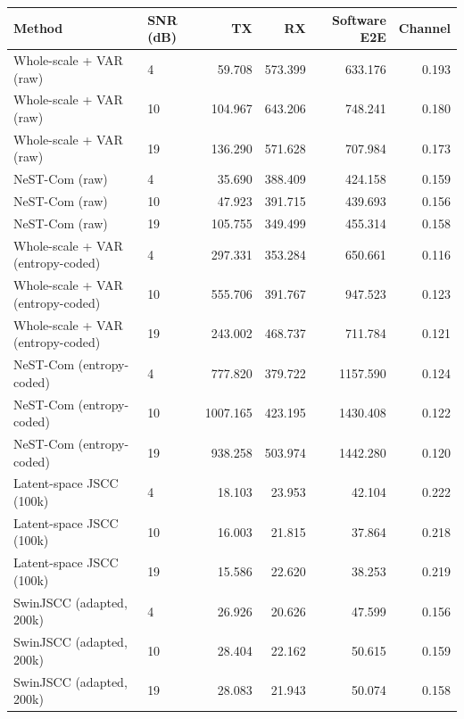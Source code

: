 \begin{tabular}{llrrrr}
\hline
Method & SNR (dB) & TX & RX & Software E2E & Channel \\
\hline
Whole-scale + VAR (raw) & 4 & 59.708 & 573.399 & 633.176 & 0.193 \\
Whole-scale + VAR (raw) & 10 & 104.967 & 643.206 & 748.241 & 0.180 \\
Whole-scale + VAR (raw) & 19 & 136.290 & 571.628 & 707.984 & 0.173 \\
NeST-Com (raw) & 4 & 35.690 & 388.409 & 424.158 & 0.159 \\
NeST-Com (raw) & 10 & 47.923 & 391.715 & 439.693 & 0.156 \\
NeST-Com (raw) & 19 & 105.755 & 349.499 & 455.314 & 0.158 \\
Whole-scale + VAR (entropy-coded) & 4 & 297.331 & 353.284 & 650.661 & 0.116 \\
Whole-scale + VAR (entropy-coded) & 10 & 555.706 & 391.767 & 947.523 & 0.123 \\
Whole-scale + VAR (entropy-coded) & 19 & 243.002 & 468.737 & 711.784 & 0.121 \\
NeST-Com (entropy-coded) & 4 & 777.820 & 379.722 & 1157.590 & 0.124 \\
NeST-Com (entropy-coded) & 10 & 1007.165 & 423.195 & 1430.408 & 0.122 \\
NeST-Com (entropy-coded) & 19 & 938.258 & 503.974 & 1442.280 & 0.120 \\
Latent-space JSCC (100k) & 4 & 18.103 & 23.953 & 42.104 & 0.222 \\
Latent-space JSCC (100k) & 10 & 16.003 & 21.815 & 37.864 & 0.218 \\
Latent-space JSCC (100k) & 19 & 15.586 & 22.620 & 38.253 & 0.219 \\
SwinJSCC (adapted, 200k) & 4 & 26.926 & 20.626 & 47.599 & 0.156 \\
SwinJSCC (adapted, 200k) & 10 & 28.404 & 22.162 & 50.615 & 0.159 \\
SwinJSCC (adapted, 200k) & 19 & 28.083 & 21.943 & 50.074 & 0.158 \\
\hline
\end{tabular}
